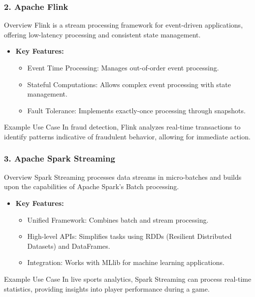 \documentclass[aspectratio=169]{beamer}
\begin{document}
\begin{frame}[fragile]
    \frametitle{2. Apache Flink}
    \begin{block}{Overview}
        Flink is a stream processing framework for event-driven applications, offering low-latency processing and consistent state management.
    \end{block}
    
    \begin{itemize}
        \item \textbf{Key Features:}
        \begin{itemize}
            \item Event Time Processing: Manages out-of-order event processing.
            \item Stateful Computations: Allows complex event processing with state management.
            \item Fault Tolerance: Implements exactly-once processing through snapshots.
        \end{itemize}
    \end{itemize}

    \begin{block}{Example Use Case}
        In fraud detection, Flink analyzes real-time transactions to identify patterns indicative of fraudulent behavior, allowing for immediate action.
    \end{block}
\end{frame}

\begin{frame}[fragile]
    \frametitle{3. Apache Spark Streaming}
    \begin{block}{Overview}
        Spark Streaming processes data streams in micro-batches and builds upon the capabilities of Apache Spark's Batch processing.
    \end{block}
    
    \begin{itemize}
        \item \textbf{Key Features:}
        \begin{itemize}
            \item Unified Framework: Combines batch and stream processing.
            \item High-level APIs: Simplifies tasks using RDDs (Resilient Distributed Datasets) and DataFrames.
            \item Integration: Works with MLlib for machine learning applications.
        \end{itemize}
    \end{itemize}

    \begin{block}{Example Use Case}
        In live sports analytics, Spark Streaming can process real-time statistics, providing insights into player performance during a game.
    \end{block}
\end{frame}
\end{document}
